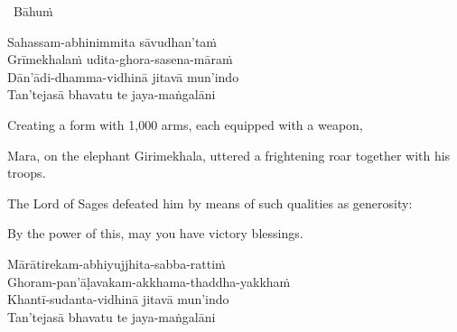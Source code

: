 \begin{pali-leader}
  \anglebracketleft\ \hspace{-0.5mm}Bāhuṁ \hspace{-0.5mm}\anglebracketright\
\end{pali-leader}
\begin{pali-hangtogether}
  Sahassam-abhinimmita sāvudhan'taṁ\\
  Grīmekhalaṁ udita-ghora-sasena-māraṁ\\
  Dān'ādi-dhamma-vidhinā jitavā\makeatletter\hyperlink{endnote129-appendix}\makeatother
  mun'indo\\
  Tan'tejasā bhavatu te jaya-maṅgalāni
\end{pali-hangtogether}

\begin{english-verses}
  Creating a form with 1,000 arms, each equipped with a weapon,
  \begin{english-hangtogether-verses}
    Mara, on the elephant Girimekhala, uttered a frightening roar together with his troops.
  \end{english-hangtogether-verses}
  \begin{english-hangtogether-verses}
    The Lord of Sages defeated him by means of such qualities as generosity:
  \end{english-hangtogether-verses}
  By the power of this, may you have victory blessings.
\end{english-verses}

\begin{pali-hang-continued}
  Mārātirekam-abhiyujjhita-sabba-rattiṁ\\
  Ghoram-pan'āḷavakam-akkhama-thaddha-yakkhaṁ\\
  Khantī-sudanta-vidhinā jitavā mun'indo\\
  Tan'tejasā bhavatu te jaya-maṅgalāni
\end{pali-hang-continued}


